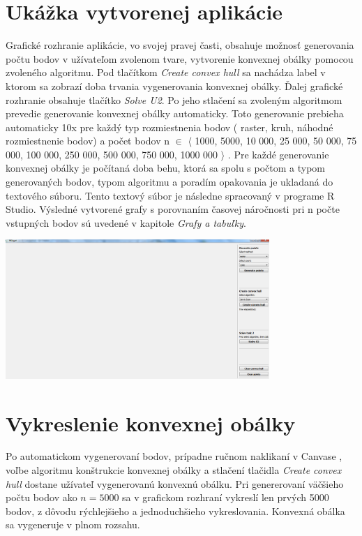 \documentclass[12pt]{article}
\begin{document}
\section{Ukážka vytvorenej aplikácie}

Grafické rozhranie aplikácie, vo svojej pravej časti, obsahuje možnosť generovania počtu bodov v užívateľom zvolenom tvare, vytvorenie konvexnej obálky pomocou zvoleného algoritmu. Pod tlačítkom \textit{Create convex hull} sa nachádza label v ktorom sa zobrazí doba trvania vygenerovania konvexnej obálky. Ďalej grafické rozhranie obsahuje tlačítko  \textit{Solve U2}. Po jeho stlačení sa zvoleným algoritmom prevedie generovanie konvexnej obálky automaticky. Toto generovanie prebieha automaticky 10x pre každý typ rozmiestnenia bodov ( raster, kruh, náhodné rozmiestnenie bodov) a počet bodov n $\in$ $\langle$ 1000, 5000, 10 000, 25 000, 50 000, 75 000, 100 000, 250 000, 500 000, 750 000, 1000 000 $\rangle$ . Pre každé generovanie konvexnej obálky je počítaná doba behu, ktorá sa spolu s počtom a typom generovaných bodov, typom algoritmu a poradím opakovania je ukladaná do textového súboru. Tento textový súbor je následne spracovaný v programe R Studio. Výsledné vytvorené grafy s porovnaním časovej náročnosti pri n počte vstupných bodov sú uvedené v kapitole \textit{Grafy a tabuľky}. 

\begin{center}
   \includegraphics[width=10cm]{./img/ukazka_aplikacia1.png}
\end{center}


\clearpage 
\section{Vykreslenie konvexnej obálky}
Po automatickom vygenerovaní bodov, prípadne ručnom naklikaní v Canvase , voľbe algoritmu konštrukcie konvexnej obálky a stlačení tlačidla \textit{Create convex hull} dostane užívateľ vygenerovanú konvexnú obálku. Pri genererovaní väčšieho počtu bodov ako $ n = 5000 $ sa v grafickom rozhraní vykreslí len prvých 5000 bodov, z dôvodu rýchlejšieho a jednoduchšieho vykreslovania. Konvexná obálka sa vygeneruje v plnom rozsahu.
 
\end{document}
